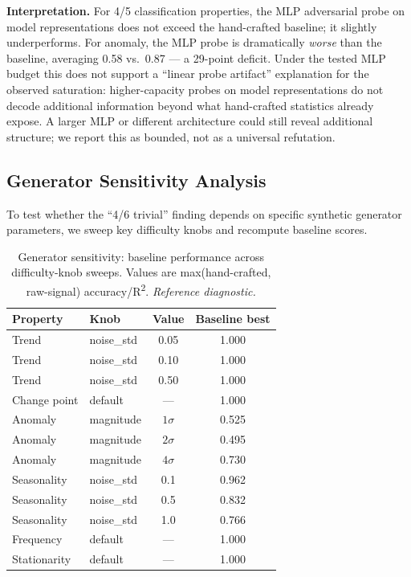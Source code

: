 \documentclass{article}
\begin{document}
\textbf{Interpretation.} For 4/5 classification properties, the MLP adversarial probe on model representations does not exceed the hand-crafted baseline; it slightly underperforms. For anomaly, the MLP probe is dramatically \emph{worse} than the baseline, averaging 0.58 vs.\ 0.87 — a 29-point deficit. Under the tested MLP budget this does not support a ``linear probe artifact'' explanation for the observed saturation: higher-capacity probes on model representations do not decode additional information beyond what hand-crafted statistics already expose. A larger MLP or different architecture could still reveal additional structure; we report this as bounded, not as a universal refutation.

\subsection{Generator Sensitivity Analysis}
\label{sec:generator_sensitivity}

To test whether the ``4/6 trivial'' finding depends on specific synthetic generator parameters, we sweep key difficulty knobs and recompute baseline scores.

\begin{table}[tbp]
\caption{Generator sensitivity: baseline performance across difficulty-knob sweeps. Values are max(hand-crafted, raw-signal) accuracy/R\textsuperscript{2}. \emph{Reference diagnostic.}}
\label{tab:generator_sensitivity}
\centering
\begin{tabular}{llcc}
\toprule
Property & Knob & Value & Baseline best \\
\midrule
Trend & noise\_std & 0.05 & 1.000 \\
Trend & noise\_std & 0.10 & 1.000 \\
Trend & noise\_std & 0.50 & 1.000 \\
Change point & default & --- & 1.000 \\
Anomaly & magnitude & $1\sigma$ & 0.525 \\
Anomaly & magnitude & $2\sigma$ & 0.495 \\
Anomaly & magnitude & $4\sigma$ & 0.730 \\
Seasonality & noise\_std & 0.1 & 0.962 \\
Seasonality & noise\_std & 0.5 & 0.832 \\
Seasonality & noise\_std & 1.0 & 0.766 \\
Frequency & default & --- & 1.000 \\
Stationarity & default & --- & 1.000 \\
\bottomrule
\end{tabular}
\end{table}
\end{document}

